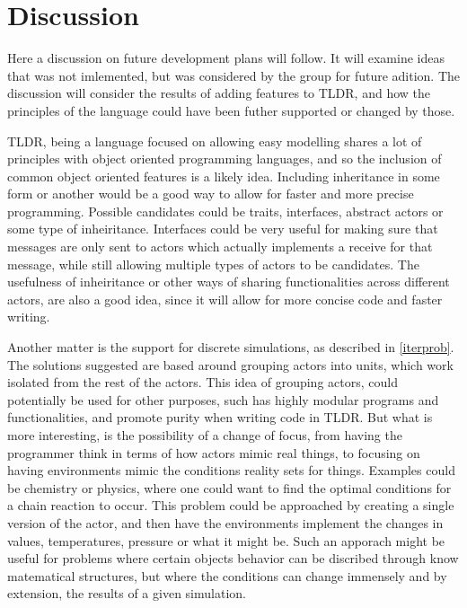 \chapter{Discussion}

Here a discussion on future development plans will follow. It will examine ideas that was not imlemented, but was considered by the group for future adition. The discussion will consider the results of adding features to TLDR, and how the principles of the language could have been futher supported or changed by those.

TLDR, being a language focused on allowing easy modelling shares a lot of principles with object oriented programming languages, and so the inclusion of common object oriented features is a likely idea. Including inheritance in some form or another would be a good way to allow for faster and more precise programming. Possible candidates could be traits, interfaces, abstract actors or some type of inheiritance. Interfaces could be very useful for making sure that messages are only sent to actors which actually implements a receive for that message, while still allowing multiple types of actors to be candidates. The usefulness of inheiritance or other ways of sharing functionalities across different actors, are also a good idea, since it will allow for more concise code and faster writing.

Another matter is the support for discrete simulations, as described in \cref{iterprob}. The solutions suggested are based around grouping actors into units, which work isolated from the rest of the actors. This idea of grouping actors, could potentially be used for other purposes, such has highly modular programs and functionalities, and promote purity when writing code in TLDR. But what is more interesting, is the possibility of a change of focus, from having the programmer think in terms of how actors mimic real things, to focusing on having environments mimic the conditions reality sets for things. Examples could be chemistry or physics, where one could want to find the optimal conditions for a chain reaction to occur. This problem could be approached by creating a single version of the actor, and then have the environments implement the changes in values, temperatures, pressure or what it might be. Such an apporach might be useful for problems where certain objects behavior can be discribed through know matematical structures, but where the conditions can change immensely and by extension, the results of a given simulation.

\section{}